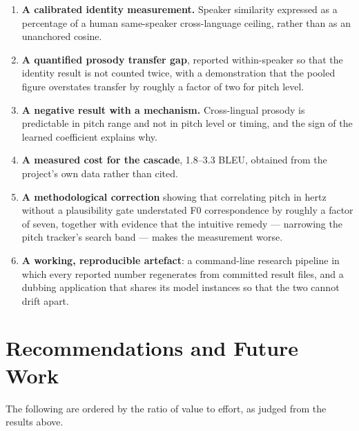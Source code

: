 \begin{enumerate}
  \item \textbf{A calibrated identity measurement.} Speaker similarity expressed as a percentage of
        a human same-speaker cross-language ceiling, rather than as an unanchored cosine.
  \item \textbf{A quantified prosody transfer gap}, reported within-speaker so that the identity
        result is not counted twice, with a demonstration that the pooled figure overstates
        transfer by roughly a factor of two for pitch level.
  \item \textbf{A negative result with a mechanism.} Cross-lingual prosody is predictable in pitch
        range and not in pitch level or timing, and the sign of the learned coefficient explains
        why.
  \item \textbf{A measured cost for the cascade}, 1.8--3.3 BLEU, obtained from the project's own
        data rather than cited.
  \item \textbf{A methodological correction} showing that correlating pitch in hertz without a
        plausibility gate understated F0 correspondence by roughly a factor of seven, together with
        evidence that the intuitive remedy --- narrowing the pitch tracker's search band --- makes
        the measurement worse.
  \item \textbf{A working, reproducible artefact}: a command-line research pipeline in which every
        reported number regenerates from committed result files, and a dubbing application that
        shares its model instances so that the two cannot drift apart.
\end{enumerate}

\section{Recommendations and Future Work}
\label{sec:future}

The following are ordered by the ratio of value to effort, as judged from the results above.

